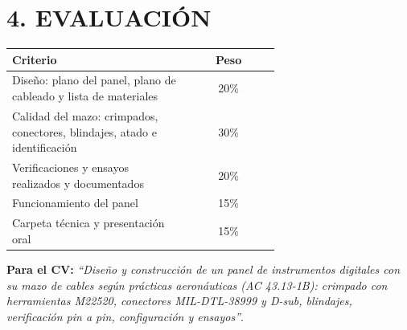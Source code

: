 \section*{4. EVALUACIÓN}
\begin{center}
\small
\begin{tabular}{|p{0.66\linewidth}|c|}
\hline
\textbf{Criterio} & \textbf{Peso} \\ \hline
Diseño: plano del panel, plano de cableado y lista de materiales & 20\% \\ \hline
Calidad del mazo: crimpados, conectores, blindajes, atado e identificación & 30\% \\ \hline
Verificaciones y ensayos realizados y documentados & 20\% \\ \hline
Funcionamiento del panel & 15\% \\ \hline
Carpeta técnica y presentación oral & 15\% \\ \hline
\end{tabular}
\end{center}

\begin{recuadro}
\textbf{Para el CV:} \textit{``Diseño y construcción de un panel de instrumentos digitales con su
mazo de cables según prácticas aeronáuticas (AC 43.13-1B): crimpado con herramientas M22520,
conectores MIL-DTL-38999 y D-sub, blindajes, verificación pin a pin, configuración y ensayos''}.
\end{recuadro}
